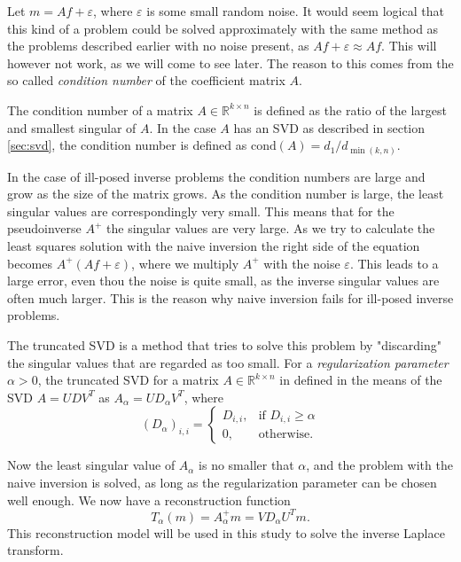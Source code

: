 \documentclass[12pt,a4]{article}
\newcommand{\R}{{\mathbb R}}
\newcommand{\eps}{\varepsilon}
\newcommand{\cond}{\ensuremath{\text{cond}}}
\begin{document}
Let $m = A f + \eps$, where $\eps$ is some small random noise. It would seem logical that this kind of a problem could be solved approximately with the same method as the problems described earlier with no noise present, as $Af + \eps \approx Af$. This will however not work, as we will come to see later. The reason to this comes from the so called \emph{condition number} of the coefficient matrix $A$.

The condition number of a matrix $A \in \R^{k \times n}$ is defined as the ratio of the largest and smallest singular of $A$. In the case $A$ has an SVD as described in section \ref{sec:svd}, the condition number is defined as $\cond(A) = d_1 / d_{\min(k,n)}$.

In the case of ill-posed inverse problems the condition numbers are large and grow as the size of the matrix grows. As the condition number is large, the least singular values are correspondingly very small. This means that for the pseudoinverse $A^+$ the singular values are very large. As we try to calculate the least squares solution with the naive inversion the right side of the equation becomes $A^+ (Af + \eps)$, where we multiply $A^+$ with the noise $\eps$. This leads to a large error, even thou the noise is quite small, as the inverse singular values are often much larger. This is the reason why naive inversion fails for ill-posed inverse problems.

The truncated SVD is a method that tries to solve this problem by "discarding" the singular values that are regarded as too small. For a \emph{regularization parameter} $\alpha > 0$, the truncated SVD for a matrix $A \in \R^{k \times n}$ in defined in the means of the SVD $A = U D V^T$ as $A_{\alpha} = U D_{\alpha} V^T$, where
\begin{equation}
(D_{\alpha})_{i,i} =
\begin{cases}
D_{i,i}, & \text{if } D_{i,i} \geq \alpha \\
0,       & \text{otherwise}.
\end{cases}
\end{equation}

Now the least singular value of $A_{\alpha}$ is no smaller that $\alpha$, and the problem with the naive inversion is solved, as long as the regularization parameter can be chosen well enough. We now have a reconstruction function
\begin{equation}
T_{\alpha}(m) = A_{\alpha}^+ m = V D_{\alpha} U^T m.
\end{equation}
This reconstruction model will be used in this study to solve the inverse Laplace transform.
\end{document}
